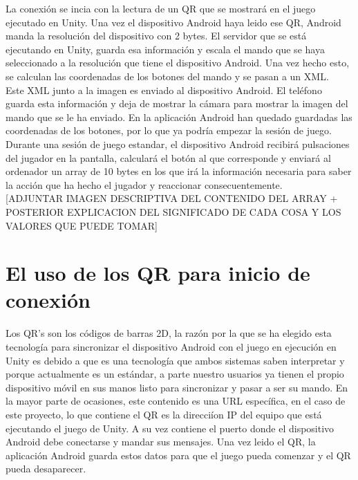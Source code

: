 La conexi\'on se incia con la lectura de un QR que se mostrar\'a en el juego ejecutado en Unity. Una vez el dispositivo Android haya leido ese QR, Android manda la resoluci\'on del dispositivo con 2 bytes. 
El servidor que se est\'a ejecutando en Unity, guarda esa informaci\'on y escala el mando que se haya seleccionado a la resoluci\'on que tiene el dispositivo Android. Una vez hecho esto, se calculan las coordenadas de los botones del mando y se pasan a un XML.
\\
Este XML junto a la imagen es enviado al dispositivo Android. El tel\'efono guarda esta informaci\'on y deja de mostrar la c\'amara para mostrar la imagen del mando que se le ha enviado. En la aplicaci\'on Android han quedado guardadas las coordenadas de los botones, por lo que ya podr\'ia empezar la sesi\'on de juego.
\\
Durante una sesi\'on de juego estandar, el dispositivo Android recibir\'a pulsaciones del jugador en la pantalla, calcular\'a el bot\'on al que corresponde y enviar\'a al ordenador un array de 10 bytes en los que ir\'a la informaci\'on necesaria para saber la acci\'on que ha hecho el jugador y reaccionar consecuentemente.
\\

[ADJUNTAR IMAGEN DESCRIPTIVA DEL CONTENIDO DEL ARRAY + POSTERIOR EXPLICACION DEL SIGNIFICADO DE CADA COSA Y LOS VALORES QUE PUEDE TOMAR]

\section{El uso de los QR para inicio de conexi\'on}
\label{cap4:QR}

Los QR's son los c\'odigos de barras 2D, la raz\'on por la que se ha elegido esta tecnolog\'ia para sincronizar el dispositivo Android con el juego en ejecuci\'on en Unity es debido a que es una tecnolog\'ia que ambos sistemas saben interpretar y porque actualmente es un est\'andar, a parte nuestro usuarios ya tienen el propio dispositivo m\'ovil en sus manos listo para sincronizar y pasar a ser su mando. En la mayor parte de ocasiones, este contenido es una URL espec\'ifica, en el caso de este proyecto, lo que contiene el QR es la direcci\'ion IP del equipo que est\'a ejecutando el juego de Unity. A su vez contiene el puerto donde el dispositivo Android debe conectarse y mandar sus mensajes. Una vez leido el QR, la aplicaci\'on Android guarda estos datos para que el juego pueda comenzar y el QR pueda desaparecer. 
\\

